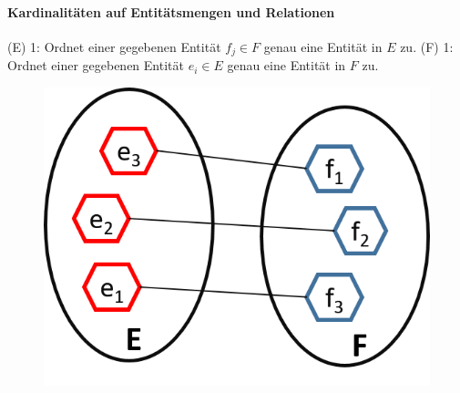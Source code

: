 \begin{frame}{\insertsection}
\framesubtitle{Kardinalitäten auf Entit\"atsmengen und Relationen}
\newline 
(E) 1: Ordnet einer gegebenen Entit\"at $f_j \in F$ genau eine Entit\"at in $E$ zu. 
\newline 
(F) 1: Ordnet einer gegebenen Entit\"at $e_i \in E$ genau eine Entit\"at in $F$ zu. 
\begin{figure}
	\includegraphics[scale=0.5]{img/ERM-11-11-Relation.png}
\end{figure}
\end{frame}

